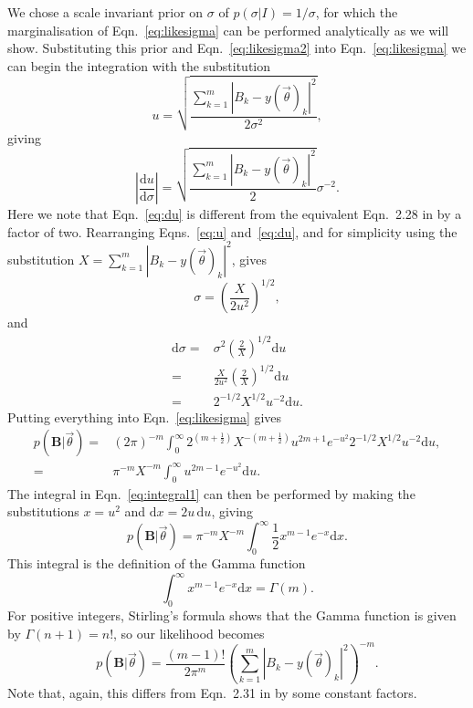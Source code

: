 We chose a scale invariant prior on $\sigma$ of $p(\sigma|I) = 1/\sigma$, for which the marginalisation of
Eqn.~\ref{eq:likesigma} can be performed analytically as we will show.
Substituting this prior and Eqn.~\ref{eq:likesigma2} into Eqn.~\ref{eq:likesigma} we can begin the
integration with the substitution
\begin{equation}\label{eq:u}
u = \sqrt{\frac{\sum_{k=1}^m|B_k-y(\vec{\theta})_k|^2}{2\sigma^2}},
\end{equation}
giving
\begin{equation}\label{eq:du}
\left|\frac{\text{d}u}{\text{d}\sigma}\right| = \sqrt{\frac{\sum_{k=1}^m|B_k-y(\vec{\theta})_k|^2}{2}}\sigma^{-2}.
\end{equation}
Here we note that Eqn.~\ref{eq:du} is different from the equivalent Eqn.~2.28 in \citet{Dupuisthesis} by a
factor of two. Rearranging Eqns.~\ref{eq:u} and~\ref{eq:du}, and for simplicity using the substitution $X =
\sum_{k=1}^m |B_k-y(\vec{\theta})_k|^2$, gives
\begin{equation}
\sigma = \left(\frac{X}{2u^2}\right)^{1/2},
\end{equation}
and
\begin{align}
\text{d}\sigma = & \sigma^2 \left(\frac{2}{X}\right)^{1/2} \text{d}u
\nonumber \\
 = & \frac{X}{2u^2} \left(\frac{2}{X}\right)^{1/2} \text{d}u \nonumber \\
 = & 2^{-1/2} X^{1/2} u^{-2} \text{d}u.
\end{align}
Putting everything into Eqn.~\ref{eq:likesigma} gives
\begin{align}\label{eq:integral1}
p(\mathbf{B}|\vec{\theta})= & (2\pi)^{-m} \int_0^{\infty} 2^{(m+\frac{1}{2})}
X^{-(m+\frac{1}{2})} u^{2m+1} e^{-u^2} 2^{-1/2} X^{1/2} u^{-2} \text{d}u, \nonumber \\
 = & \pi^{-m} X^{-m} \int_0^{\infty} u^{2m-1} e^{-u^2} \text{d}u.
\end{align}
The integral in Eqn.~\ref{eq:integral1} can then be performed by making the substitutions $x = u^2$ and $\text{d}x
= 2u\,\text{d}u$, giving
\begin{equation}
p(\mathbf{B}|\vec{\theta}) = \pi^{-m} X^{-m} \int_0^{\infty} \frac{1}{2} x^{m-1} e^{-x}
\text{d}x.
\end{equation}
This integral is the definition of the Gamma function
\begin{equation}
 \int_0^{\infty} x^{m-1} e^{-x} \text{d}x = \Gamma(m).
\end{equation}
For positive integers, Stirling's formula shows that the Gamma function is given by $\Gamma(n+1) = n!$, so our
likelihood becomes
\begin{equation}\label{eq:complex}
p(\mathbf{B}|\vec{\theta}) = \frac{(m-1)!}{2\pi^m} \left(\sum_{k=1}^m
|B_k-y(\vec{\theta})_k|^2\right)^{-m}.
\end{equation}
Note that, again, this differs from Eqn.~2.31 in \citet{Dupuisthesis} by some constant factors.

